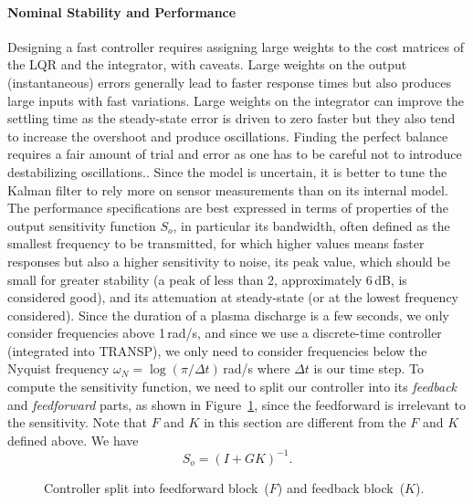 \documentclass[12pt,lot, lof]{puthesis}
\begin{document}
\paragraph{Nominal Stability and Performance}

Designing a fast controller requires assigning large weights to the cost matrices of the LQR and the integrator, with caveats.
Large weights on the output (instantaneous) errors generally lead to faster response times but also produces large inputs with fast variations.
Large weights on the integrator can improve the settling time as the steady-state error is driven to zero faster but they also tend to increase the overshoot and produce oscillations.
Finding the perfect balance requires a fair amount of trial and error as one has to be careful not to introduce destabilizing oscillations..
Since the model is uncertain, it is better to tune the Kalman filter to rely more on sensor measurements than on its internal model.
The performance specifications are best expressed in terms of properties of the output sensitivity function $S_o$, in particular
its bandwidth, often defined as the smallest frequency to be transmitted, for which higher values means faster responses but also a higher sensitivity to noise,
its peak value, which should be small for greater stability (a peak of  less than 2, approximately 6\,dB, is considered good),
and its attenuation at steady-state (or at the lowest frequency considered).
Since the duration of a plasma discharge is a few seconds, we only consider frequencies above 1\,rad/s,
and since we use a discrete-time controller (integrated into TRANSP), we only need to consider frequencies below the Nyquist frequency $\omega_N = \log(\pi/\Delta t)$\,rad/s where $\Delta t$ is our time step.
To compute the sensitivity function, we need to split our controller into its \emph{feedback} and \emph{feedforward} parts, as shown in Figure~\ref{fig:split_controller}, since the feedforward is irrelevant to the sensitivity. Note that $F$ and $K$ in this section are different from the $F$ and $K$ defined above.
We have
\begin{equation}
	S_o = (I + G K)^{-1}.
\end{equation}

\begin{figure}[htbp]
	\centering
	\caption{Controller split into feedforward block~($F$) and feedback block~($K$).}
	\label{fig:split_controller}
\end{figure}
\end{document}
